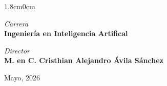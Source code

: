 \begin{adjustwidth}{1.8cm}{0cm}
    \begin{center}
    \textit{Carrera}\\
        \bf{Ingeniería en Inteligencia Artifical}
    \end{center}
    \vspace{0.5cm} %
    
    {\fontsize{14pt}{14pt}\selectfont
    \begin{center}
    \textit{Director}\\
    \bf {M. en C. Cristhian Alejandro Ávila Sánchez}
    \end{center}
    }
    
    \vspace{1.5cm} %
    
    {\fontsize{12pt}{14pt}\selectfont
    \begin{flushright}
    Mayo, 2026
    \end{flushright}
    }

\end{adjustwidth}

